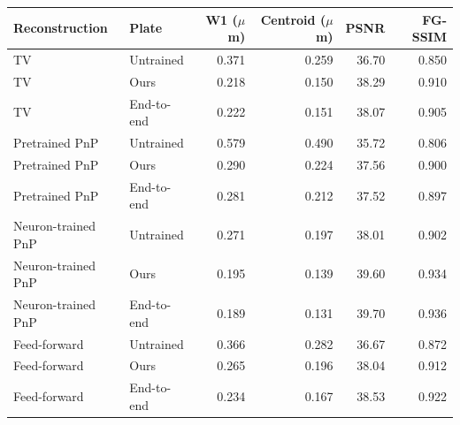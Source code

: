 \begin{tabular}{llrrrr}
\toprule
Reconstruction & Plate & W1 ($\mu$m) & Centroid ($\mu$m) & PSNR & FG-SSIM \\
\midrule
TV & Untrained & 0.371 & 0.259 & 36.70 & 0.850 \\
TV & Ours & 0.218 & 0.150 & 38.29 & 0.910 \\
TV & End-to-end & 0.222 & 0.151 & 38.07 & 0.905 \\
\midrule
Pretrained PnP & Untrained & 0.579 & 0.490 & 35.72 & 0.806 \\
Pretrained PnP & Ours & 0.290 & 0.224 & 37.56 & 0.900 \\
Pretrained PnP & End-to-end & 0.281 & 0.212 & 37.52 & 0.897 \\
\midrule
Neuron-trained PnP & Untrained & 0.271 & 0.197 & 38.01 & 0.902 \\
Neuron-trained PnP & Ours & 0.195 & 0.139 & 39.60 & 0.934 \\
Neuron-trained PnP & End-to-end & 0.189 & 0.131 & 39.70 & 0.936 \\
\midrule
Feed-forward & Untrained & 0.366 & 0.282 & 36.67 & 0.872 \\
Feed-forward & Ours & 0.265 & 0.196 & 38.04 & 0.912 \\
Feed-forward & End-to-end & 0.234 & 0.167 & 38.53 & 0.922 \\
\bottomrule
\end{tabular}
